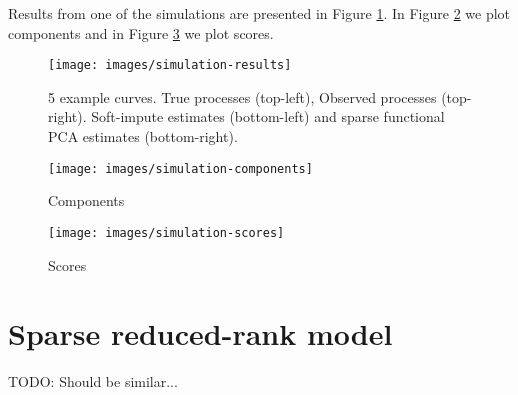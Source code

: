 \documentclass{article}
\begin{document}
Results from one of the simulations are presented in Figure \ref{fig:results}. In Figure \ref{fig:components} we plot components and in Figure \ref{fig:scores} we plot scores.


\begin{figure}[h]
  \texttt{[image: images/simulation-results]}
  \caption{5 example curves. True processes (top-left), Observed processes (top-right). Soft-impute estimates (bottom-left) and sparse functional PCA estimates (bottom-right).}
  \label{fig:results}
\end{figure}

\begin{figure}[h]
  \texttt{[image: images/simulation-components]}
  \caption{Components}
  \label{fig:components}
\end{figure}

\begin{figure}[h]
  \texttt{[image: images/simulation-scores]}
  \caption{Scores}
  \label{fig:scores}
\end{figure}

\section{Sparse reduced-rank model}
TODO: Should be similar...
\end{document}
